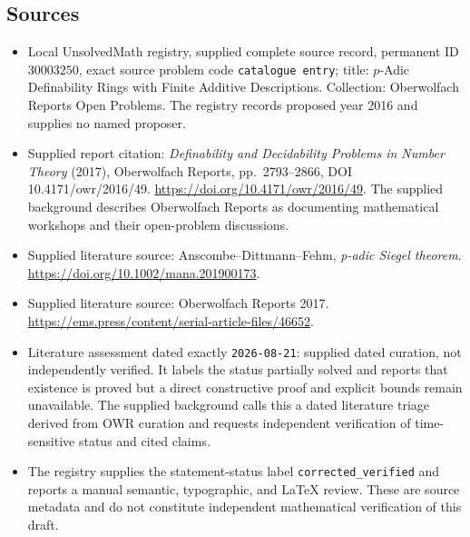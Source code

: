 \documentclass[11pt]{article}
\begin{document}
\subsection{Sources}
\begin{itemize}
\item Local UnsolvedMath registry, supplied complete source record, permanent ID \(30003250\), exact source problem code \texttt{catalogue entry}; title: \(p\)-Adic Definability Rings with Finite Additive Descriptions. Collection: Oberwolfach Reports Open Problems. The registry records proposed year 2016 and supplies no named proposer.
\item Supplied report citation: \emph{Definability and Decidability Problems in Number Theory} (2017), Oberwolfach Reports, pp.\ 2793--2866, DOI 10.4171/owr/2016/49. \url{https://doi.org/10.4171/owr/2016/49}. The supplied background describes Oberwolfach Reports as documenting mathematical workshops and their open-problem discussions.
\item Supplied literature source: Anscombe--Dittmann--Fehm, \emph{p-adic Siegel theorem}. \url{https://doi.org/10.1002/mana.201900173}.
\item Supplied literature source: Oberwolfach Reports 2017. \url{https://ems.press/content/serial-article-files/46652}.
\item Literature assessment dated exactly \texttt{2026-08-21}: supplied dated curation, not independently verified. It labels the status partially solved and reports that existence is proved but a direct constructive proof and explicit bounds remain unavailable. The supplied background calls this a dated literature triage derived from OWR curation and requests independent verification of time-sensitive status and cited claims.
\item The registry supplies the statement-status label \texttt{corrected\_verified} and reports a manual semantic, typographic, and LaTeX review. These are source metadata and do not constitute independent mathematical verification of this draft.
\end{itemize}
\end{document}
